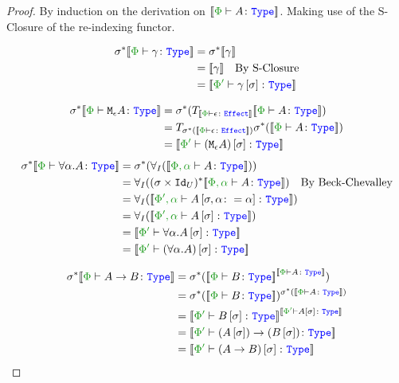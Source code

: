 \documentclass{report}
\begin{document}
\begin{framed}
    \begin{proof}
        By induction on the derivation on $\deno{\typerelation{\P}{A}{\type}}$. Making use of the S-Closure of the re-indexing functor.
        
        \begin{align*}
            \si\star\deno{\typerelation{\P}{\g}{\type}} &= \si\star\deno{\g}\\
            & =  \deno{\g}\qt{By S-Closure}\\
            & = \deno{\typerelation{\P'}{\g\ssi}{\type}}
        \end{align*}
        
        \begin{align*}
            \si\star\deno{\typerelation{\P}{\mea}{\type}} & =  \si\star(\T{\deno{\typerelation{\P}{\e}{\effect}}}{\deno{\typerelation{\P}{A}{\type}}})\\
            &= \T{\si\star(\deno{\typerelation{\P}{\e}{\effect}})}{\si\star(\deno{\typerelation{\P}{A}{\type}})}\\
            & = \deno{\typerelation{\P'}{(\mea)\ssi}{\type}}
        \end{align*}
            \begin{align*}
                \si\star\deno{\typerelation{\P}{\all{\a}A}{\type}} & = \si\star(\allI(\deno{\typerelation{\P,\a}{A}{\type}}))\\
                & = \allI((\si\times\Id{U})\star\deno{\typerelation{\P,\a}{A}{\type}})\qt{By Beck-Chevalley}\\
                & = \allI(\deno{\typerelation{\P',\a}{A\sub{\si, \a\setto\a}}{\type}})\\
                & = \allI(\deno{\typerelation{\P',\a}{A\ssi}{\type}})\\
                & = \deno{\typerelation{\P'}{\all{\a}{A\ssi}}{\type}}\\
                & = \deno{\typerelation{\P'}{(\all{\a}{A})\ssi}{\type}}\\
            \end{align*}
        
        \begin{align*}
            \si\star\deno{\typerelation{\P}{\ab}{\type}} &= \si\star(\deno{\typerelation{\P}{B}{\type}}^{\deno{\typerelation{\P}{A}{\type}}})\\
            &=\si\star(\deno{\typerelation{\P}{B}{\type}})^{\si\star(\deno{\typerelation{\P}{A}{\type}})}\\
            & = \deno{\typerelation{\P'}{B\ssi}{\type}}^{\deno{\typerelation{\P'}{A\ssi}{\type}}}\\
            & = \deno{\typerelation{\P'}{\fntype{(A\ssi)}{(B\ssi)}}{\type}}\\
            & = \deno{\typerelation{\P'}{(\ab)\ssi}{\type}}\\
        \end{align*}
    \end{proof}
\end{framed}
\end{document}
